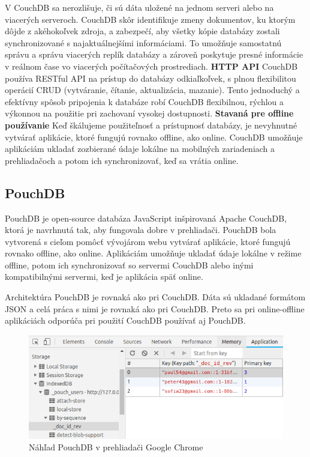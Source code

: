 \indent V CouchDB sa nerozlišuje, či sú dáta uložené na jednom serveri alebo na viacerých serveroch. CouchDB skôr identifikuje zmeny dokumentov, ku ktorým dôjde z akéhokoľvek zdroja, a zabezpečí, aby všetky kópie databázy zostali synchronizované s najaktuálnejšími informáciami. To umožňuje samostatnú správu a správu viacerých replík databázy a zároveň poskytuje presné informácie v reálnom čase vo viacerých počítačových prostrediach.
\newline
\newline
\textbf{HTTP API} \newline
\indent CouchDB používa RESTful API na prístup do databázy odkiaľkoľvek, s plnou flexibilitou operácií CRUD (vytváranie, čítanie, aktualizácia, mazanie). Tento jednoduchý a efektívny spôsob pripojenia k databáze robí CouchDB flexibilnou, rýchlou a výkonnou na použitie pri zachovaní vysokej dostupnosti.
\newline
\newline
\textbf{Stavaná pre offline používanie} \newline
\indent Keď škálujeme použiteľnosť a prístupnosť databázy, je nevyhnutné vytvárať aplikácie, ktoré fungujú rovnako offline, ako online. CouchDB umožňuje aplikáciám ukladať zozbierané údaje lokálne na mobilných zariadeniach a prehliadačoch a potom ich synchronizovať, keď sa vrátia online.

\subsection{PouchDB}
\indent PouchDB je open-source databáza JavaScript inšpirovaná Apache CouchDB, ktorá je navrhnutá tak, aby fungovala dobre v prehliadači. PouchDB bola vytvorená s cieľom pomôcť vývojárom webu vytvárať aplikácie, ktoré fungujú rovnako offline, ako online. Aplikáciám umožňuje ukladať údaje lokálne v režime offline, potom ich synchronizovať so servermi CouchDB alebo inými kompatibilnými servermi, keď je aplikácia späť online.

\indent Architektúra PouchDB je rovnaká ako pri CouchDB. Dáta sú ukladané formátom JSON a celá práca s nimi je rovnaká ako pri CouchDB. Preto sa pri online-offline aplikáciách odporúča pri použití CouchDB používať aj PouchDB.

\begin{figure}[H]
    \centering
    \includegraphics[scale=0.80]{img/pouchdb.png}
    \caption{Náhľad PouchDB v prehliadači Google Chrome}
    \label{fig:pouch_db}
\end{figure}


